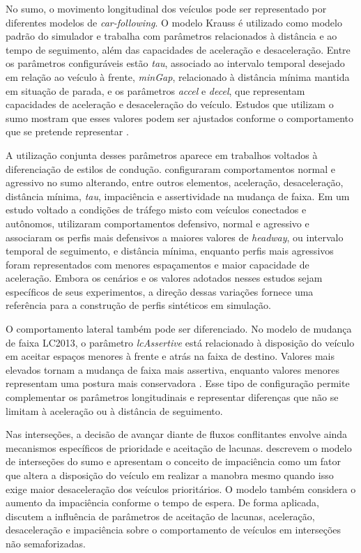 No \gls{sumo}, o movimento longitudinal dos veículos pode ser representado por diferentes modelos de \textit{car-following}. O modelo Krauss é utilizado como modelo padrão do simulador e trabalha com parâmetros relacionados à distância e ao tempo de seguimento, além das capacidades de aceleração e desaceleração. Entre os parâmetros configuráveis estão \textit{tau}, associado ao intervalo temporal desejado em relação ao veículo à frente, \textit{minGap}, relacionado à distância mínima mantida em situação de parada, e os parâmetros \textit{accel} e \textit{decel}, que representam capacidades de aceleração e desaceleração do veículo. Estudos que utilizam o \gls{sumo} mostram que esses valores podem ser ajustados conforme o comportamento que se pretende representar \cite{mecheva_2022,schrader_2024a}.

A utilização conjunta desses parâmetros aparece em trabalhos voltados à diferenciação de estilos de condução.  configuraram comportamentos normal e agressivo no \gls{sumo} alterando, entre outros elementos, aceleração, desaceleração, distância mínima, \textit{tau}, impaciência e assertividade na mudança de faixa. Em um estudo voltado a condições de tráfego misto com veículos conectados e autônomos,  utilizaram comportamentos defensivo, normal e agressivo e associaram os perfis mais defensivos a maiores valores de \textit{headway}, ou intervalo temporal de seguimento, e distância mínima, enquanto perfis mais agressivos foram representados com menores espaçamentos e maior capacidade de aceleração. Embora os cenários e os valores adotados nesses estudos sejam específicos de seus experimentos, a direção dessas variações fornece uma referência para a construção de perfis sintéticos em simulação.

O comportamento lateral também pode ser diferenciado. No modelo de mudança de faixa LC2013, o parâmetro \textit{lcAssertive} está relacionado à disposição do veículo em aceitar espaços menores à frente e atrás na faixa de destino. Valores mais elevados tornam a mudança de faixa mais assertiva, enquanto valores menores representam uma postura mais conservadora \cite{yavuz_2025}. Esse tipo de configuração permite complementar os parâmetros longitudinais e representar diferenças que não se limitam à aceleração ou à distância de seguimento.

Nas interseções, a decisão de avançar diante de fluxos conflitantes envolve ainda mecanismos específicos de prioridade e aceitação de lacunas.  descrevem o modelo de interseções do \gls{sumo} e apresentam o conceito de impaciência como um fator que altera a disposição do veículo em realizar a manobra mesmo quando isso exige maior desaceleração dos veículos prioritários. O modelo também considera o aumento da impaciência conforme o tempo de espera. De forma aplicada,  discutem a influência de parâmetros de aceitação de lacunas, aceleração, desaceleração e impaciência sobre o comportamento de veículos em interseções não semaforizadas.

